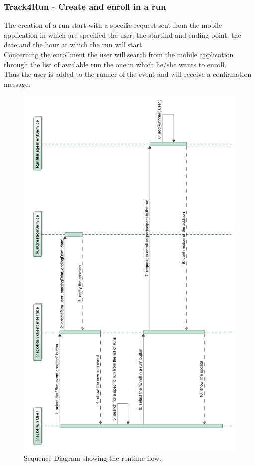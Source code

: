 \documentclass[a4paper]{article}
\begin{document}
\subsubsection{Track4Run - Create and enroll in a run}
The creation of a run start with a specific request sent from the mobile application in which are specified the user, the startind and ending point, the date and the hour at which the run will start. \\
Concerning the enrollment the user will search from the mobile application through the list of available run the one in which he/she wants to enroll. \\
Thus the user is added to the runner of the event and will receive a confirmation message.

\begin{figure}[H]
    \centering
    \includegraphics[width=\linewidth]{SequenceDiagram-CreateAndEnrollToARunEvent}
    \caption{Sequence Diagram showing the runtime flow.}
    \label{fig:my_label}
\end{figure}
\clearpage
\end{document}
